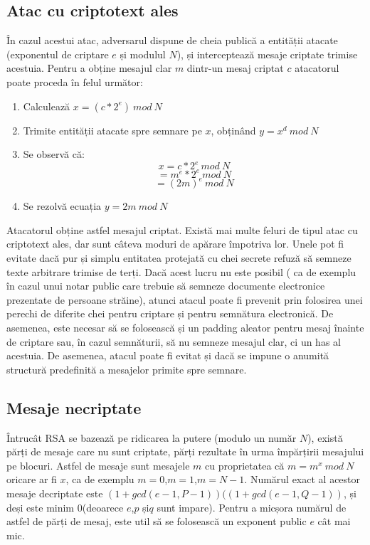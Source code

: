 \documentclass[12]{article}
\begin{document}
\subsection{Atac cu criptotext ales}
În cazul acestui atac, adversarul dispune de cheia publică a entității atacate (exponentul de criptare $e$ și modulul $N$), și interceptează mesaje criptate trimise acestuia. Pentru a obține mesajul clar $m$ dintr-un mesaj criptat $c$ atacatorul poate proceda în felul următor:
\begin{enumerate}
\item Calculează $x=(c * 2^e) \ mod \ N$
\item Trimite entității atacate spre semnare pe $x$, obținând $y=x^d \ mod \ N$
\item Se observă că: 
$$x=c*2^e \ mod \ N $$
$$=m^e * 2^e \ mod \ N$$
$$=(2m)^e \ mod \ N$$ 
\item Se rezolvă ecuația $y=2m \ mod \ N$
\end{enumerate}
Atacatorul obține astfel mesajul criptat. Există mai multe feluri de tipul atac cu criptotext ales, dar sunt câteva moduri de apărare împotriva lor. Unele pot fi evitate dacă pur și simplu entitatea protejată cu chei secrete refuză să semneze texte arbitrare trimise de terți. Dacă acest lucru nu este posibil ( ca de exemplu în cazul unui notar public care trebuie să semneze documente electronice prezentate de persoane străine), atunci atacul poate fi prevenit prin folosirea unei perechi de diferite chei pentru criptare și pentru semnătura electronică. De asemenea, este necesar să se folosească și un padding aleator pentru mesaj înainte de criptare sau, în cazul semnăturii, să nu semneze mesajul clar, ci un has al acestuia. De asemenea, atacul poate fi evitat și dacă se impune o anumită structură predefinită a mesajelor primite spre semnare.
\subsection{Mesaje necriptate}
Întrucât RSA se bazează pe ridicarea la putere (modulo un număr $N$), există părți de mesaje care nu sunt criptate, părți rezultate în urma împărțirii mesajului pe blocuri. Astfel de mesaje sunt mesajele $m$ cu proprietatea că $m=m^x \ mod \ N$ oricare ar fi $x$, ca de exemplu $m=0$,$m=1$,$m=N-1$. Numărul exact al acestor mesaje decriptate este $(1+gcd(e-1,P-1))((1+gcd(e-1,Q-1))$, și deși este minim 0(deoarece $e$,$p$ și$q$ sunt impare). Pentru a micșora numărul de astfel de părți de mesaj, este util să se folosească un exponent public $e$ cât mai mic.
\end{document}
